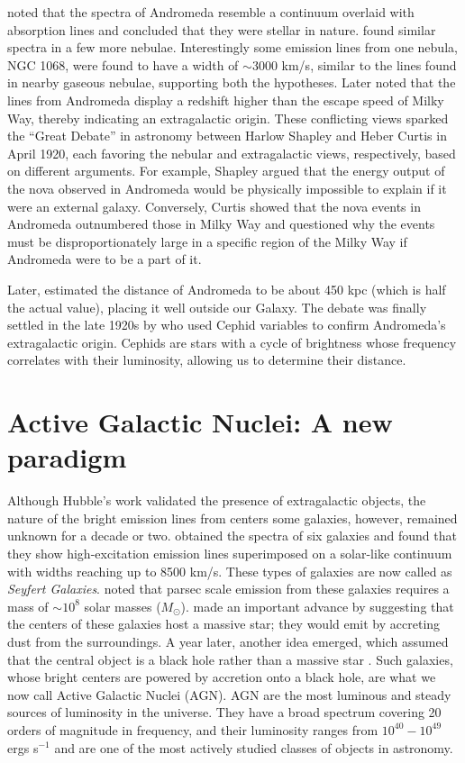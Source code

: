 \citet{huggins1864xiii} noted that the spectra of Andromeda resemble a continuum overlaid with absorption lines and concluded that they were stellar in nature. \citet{fath1909spectra} found similar spectra in a few more nebulae. Interestingly some emission lines from one nebula, NGC 1068, were found to have a width of  $\sim$3000 km/s, similar to the lines found in nearby gaseous nebulae, supporting both the hypotheses. Later \citet{slipher1913radial} noted that the lines from Andromeda display a redshift higher than the escape speed of Milky Way, thereby indicating an extragalactic origin. These conflicting views sparked the ``Great Debate'' in astronomy \citep{1921BuNRC...2..171S} between Harlow Shapley and Heber Curtis in April 1920, each favoring the nebular and extragalactic views, respectively, based on different arguments. For example, Shapley argued that the energy output of the nova observed in Andromeda \citep{1888MNRAS..48..108B} would be physically impossible to explain if it were an external galaxy. Conversely, Curtis showed that the nova events in Andromeda outnumbered those in Milky Way and questioned why the events must be disproportionately large in a specific region of the Milky Way if Andromeda were to be a part of it.

Later, \citet{opik1922estimate}  estimated the distance of Andromeda to be about 450 kpc (which is half the actual value), placing it well outside our Galaxy. The debate was finally settled in the late 1920s by \citet{hubble1929relation} who used Cephid variables to confirm Andromeda's extragalactic origin. Cephids are stars with a cycle of brightness whose frequency correlates with their luminosity, allowing us to determine their distance. 

\section{Active Galactic Nuclei: A new paradigm}
Although Hubble's work validated the presence of extragalactic objects, the nature of the bright emission lines from centers some galaxies, however,  remained unknown for a decade or two.  \citet{seyfert1943nuclear} obtained the spectra of six galaxies and found that they show high-excitation emission lines superimposed on a solar-like continuum with widths reaching up to 8500 km/s. These types of galaxies are now called as \textit{Seyfert Galaxies}.  \citet{woltjer1960magnetostatic} noted that parsec scale emission from these galaxies requires a mass of $\sim 10^8$ solar masses ($M_\odot$). \citet{fowler1963star} made an important advance by suggesting that the centers of these galaxies host a massive star; they would emit by accreting dust from the surroundings. A year later, another idea emerged, which assumed that the central object is a black hole rather than a massive star \citep{salpeter1964accretion,zel1964estimating}. Such galaxies, whose bright centers are powered by accretion onto a black hole, are what we now call Active Galactic Nuclei (AGN). AGN are the most luminous and steady sources of luminosity in the universe. They have a broad spectrum covering 20 orders of magnitude in frequency, and their luminosity ranges from $10^{40}-10^{49}$ ergs s$^{-1}$ and are one of the most actively studied classes of objects in astronomy.

